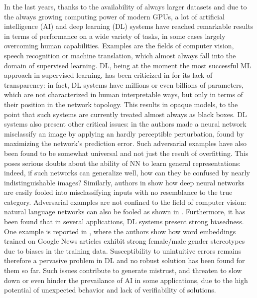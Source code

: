 In the last years, thanks to the availability of always larger datasets and due to the always growing computing power of modern GPUs, a lot of artificial intelligence (AI) and deep learning (DL) systems have reached remarkable results in terms of performance on a wide variety of tasks, in some cases largely overcoming human capabilities. Examples are the fields of computer vision, speech recognition or machine translation, which almost always fall into the domain of supervised learning. 
DL, being at the moment the most successful ML approach in supervised learning, has been criticized in \cite{marcus2018appraisal} 
for its lack of transparency: in fact, DL systems have millions or even billions of parameters, which are not characterized in human interpretable ways, but only in terms of their position in the network topology. This results in opaque models, to the point that such systems are currently treated almost always as black boxes. DL systems also present other critical issues: in \cite{szegedy2013intriguing} the authors made a neural network misclassify an image by applying an hardly perceptible perturbation, found by maximizing the network’s prediction error. Such adversarial examples have also been found to be somewhat universal and not just the result of overfitting. This poses serious doubts about the ability of NN to learn general representations: indeed, if such networks can generalize well, how can they be confused by nearly indistinguishable images? Similarly, authors in \cite{nguyen2015fooled} show how deep neural networks are easily fooled into misclassifying inputs with no resemblance to the true category. Adversarial examples are not confined to the field of computer vision: natural language networks can also be fooled as shown in \cite{jia2017adversarial}. Furthermore, it has been found that in several applications, DL systems present strong biasedness. One example is reported in \cite{bolukbasi2016debiasing}, where the authors show how word embeddings trained on Google News articles exhibit strong female/male gender stereotypes due to biases in the training data. Susceptibility to unintuitive errors remains therefore a pervasive problem in DL and no robust solution has been found for them so far. Such issues contribute to generate mistrust, and threaten to slow down or even hinder the prevailance of AI in some applications, due to the high potential of unexpected behavior and lack of verifiability of solutions.
